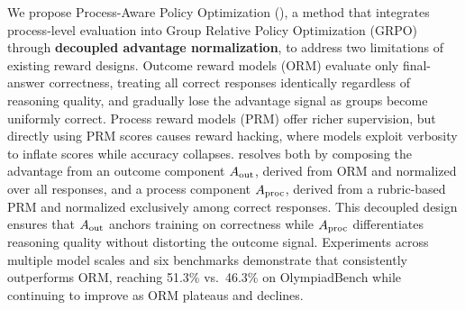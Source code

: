 We propose Process-Aware Policy Optimization (\method{}), a method that integrates process-level evaluation into Group Relative Policy Optimization (GRPO) through \textbf{decoupled advantage normalization}, to address two limitations of existing reward designs. Outcome reward models (ORM) evaluate only final-answer correctness, treating all correct responses identically regardless of reasoning quality, and gradually lose the advantage signal as groups become uniformly correct. Process reward models (PRM) offer richer supervision, but directly using PRM scores causes reward hacking, where models exploit verbosity to inflate scores while accuracy collapses. \method{} resolves both by composing the advantage from an outcome component $\aout$, derived from ORM and normalized over all responses, and a process component $\aproc$, derived from a rubric-based PRM and normalized exclusively among correct responses. This decoupled design ensures that $\aout$ anchors training on correctness while $\aproc$ differentiates reasoning quality without distorting the outcome signal. Experiments across multiple model scales and six benchmarks demonstrate that \method{} consistently outperforms ORM, reaching 51.3\% vs.\ 46.3\% on OlympiadBench while continuing to improve as ORM plateaus and declines.
